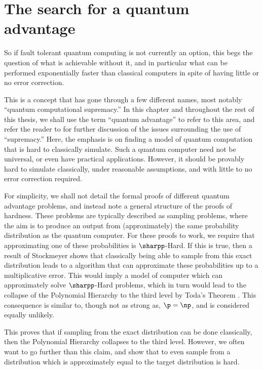 \section{The search for a quantum advantage}
\label{sec:quantum-advantage}

So if fault tolerant quantum computing is not currently an option, this begs the question of what is achievable without it, and in particular what can be performed exponentially faster than classical computers in spite of having little or no error correction.

This is a concept that has gone through a few different names, most notably ``quantum computational supremacy.'' In this chapter and throughout the rest of this thesis, we shall use the term ``quantum advantage'' to refer to this area, and refer the reader to \cite{wiesner2017, palaciosberraquero2019} for further discussion of the issues surrounding the use of ``supremacy.'' Here, the emphasis is on finding a model of quantum computation that is hard to classically simulate. Such a quantum computer need not be universal, or even have practical applications. However, it should be provably hard to simulate classically, under reasonable assumptions, and with little to no error correction required.

For simplicity, we shall not detail the formal proofs of different quantum advantage problems, and instead note a general structure of the proofs of hardness. These problems are typically described as sampling problems, where the aim is to produce an output from (approximately) the same probability distribution as the quantum computer. For these proofs to work, we require that approximating one of these probabilities is $\sharpp$-Hard. If this is true, then a result of Stockmeyer \cite{stockmeyer1983} shows that classically being able to sample from this exact distribution leads to a algorithm that can approximate these probabilities up to a multiplicative error. This would imply a model of computer which can approximately solve $\sharpp$-Hard problems, which in turn would lead to the collapse of the Polynomial Hierarchy to the third level by Toda's Theorem \cite{toda1991}. This consequence is similar to, though not as strong as, $\p=\np$, and is considered equally unlikely.

This proves that if sampling from the exact distribution can be done classically, then the Polynomial Hierarchy collapses to the third level. However, we often want to go further than this claim, and show that to even sample from a distribution which is approximately equal to the target distribution is hard.

